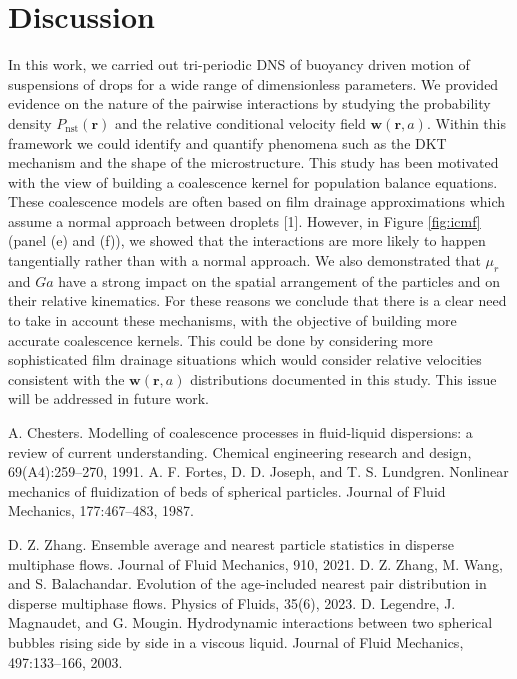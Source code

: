 \documentclass[9pt,a4paper]{article}
\begin{document}
\section{Discussion}
\vspace*{-10pt}
In this work, we carried out tri-periodic DNS of buoyancy driven motion of suspensions of drops for a wide range of dimensionless parameters. 
We provided evidence on the nature of the pairwise interactions by studying the probability density $P_\text{nst}(\textbf{r})$ and the relative conditional velocity field $\textbf{w}(\textbf{r},a)$. 
Within this framework  we could identify and quantify phenomena such as the DKT mechanism and the shape of the microstructure. 
This study has been motivated with the view of building a coalescence kernel for population balance equations. 
These coalescence models are often based on film drainage approximations which assume a normal approach between droplets [1].  
However, in Figure \ref{fig:icmf} (panel (e) and (f)), we showed that the interactions are more likely to happen tangentially rather than with a normal approach. 
We also demonstrated that $\mu_r$ and $Ga$ have a strong impact on the spatial arrangement of the particles and on their relative kinematics.   
For these reasons we conclude that there is a clear need to take in account these mechanisms, with the objective of building more accurate coalescence kernels. 
This could be done by considering more sophisticated film drainage situations which would consider relative velocities consistent with the $\textbf{w}(\textbf{r},a)$ distributions documented in this study.
This issue will be addressed in future work.  


\begin{thebibliography}{1}
    A. Chesters. Modelling of coalescence processes in fluid-liquid dispersions: a review of current understanding. Chemical
    engineering research and design, 69(A4):259–270, 1991.
    A. F. Fortes, D. D. Joseph, and T. S. Lundgren. Nonlinear mechanics of fluidization of beds of spherical particles. Journal of
Fluid Mechanics, 177:467–483, 1987.
    
    D. Z. Zhang. Ensemble average and nearest particle statistics in disperse multiphase flows. Journal of Fluid Mechanics, 910,
    2021.
    D. Z. Zhang, M. Wang, and S. Balachandar. Evolution of the age-included nearest pair distribution in disperse multiphase
flows. Physics of Fluids, 35(6), 2023.
D. Legendre, J. Magnaudet, and G. Mougin. Hydrodynamic interactions between two spherical bubbles rising
side by side in a viscous liquid. Journal of Fluid Mechanics, 497:133–166, 2003.
\end{thebibliography}
\end{document}
